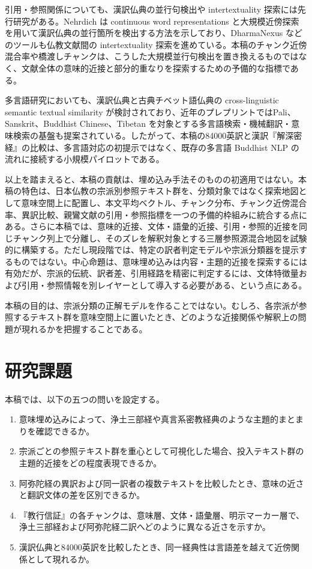 \documentclass[uplatex,dvipdfmx,11pt,a4paper]{jsarticle}
\begin{document}
引用・参照関係についても、漢訳仏典の並行句検出や intertextuality 探索には先行研究がある。Nehrdich は continuous word representations と大規模近傍探索を用いて漢訳仏典の並行箇所を検出する方法を示しており\cite{nehrdich2020}、DharmaNexus などのツールも仏教文献間の intertextuality 探索を進めている\cite{dharmanexus}。本稿のチャンク近傍混合率や橋渡しチャンクは、こうした大規模並行句検出を置き換えるものではなく、文献全体の意味的近接と部分的重なりを探索するための予備的な指標である。

多言語研究においても、漢訳仏典と古典チベット語仏典の cross-linguistic semantic textual similarity が検討されており\cite{felbur2022}、近年のプレプリントではPali、Sanskrit、Buddhist Chinese、Tibetan を対象とする多言語検索・機械翻訳・意味検索の基盤も提案されている\cite{mitra2026}。したがって、本稿の84000英訳と漢訳『解深密経』の比較は、多言語対応の初提示ではなく、既存の多言語 Buddhist NLP の流れに接続する小規模パイロットである。

以上を踏まえると、本稿の貢献は、埋め込み手法そのものの初適用ではない。本稿の特色は、日本仏教の宗派別参照テキスト群を、分類対象ではなく探索地図として意味空間上に配置し、本文平均ベクトル、チャンク分布、チャンク近傍混合率、異訳比較、親鸞文献の引用・参照指標を一つの予備的枠組みに統合する点にある。さらに本稿では、意味的近接、文体・語彙的近接、引用・参照的近接を同じチャンク列上で分離し、そのズレを解釈対象とする三層参照源混合地図を試験的に構築する。ただし現段階では、特定の訳者判定モデルや宗派分類器を提示するものではない。中心命題は、意味埋め込みは内容・主題的近接を探索するには有効だが、宗派的伝統、訳者差、引用経路を精密に判定するには、文体特徴量および引用・参照情報を別レイヤーとして導入する必要がある、という点にある。

本稿の目的は、宗派分類の正解モデルを作ることではない。むしろ、各宗派が参照するテキスト群を意味空間上に置いたとき、どのような近接関係や解釈上の問題が現れるかを把握することである。

\section{研究課題}

本稿では、以下の五つの問いを設定する。

\begin{enumerate}
  \item 意味埋め込みによって、浄土三部経や真言系密教経典のような主題的まとまりを確認できるか。
  \item 宗派ごとの参照テキスト群を重心として可視化した場合、投入テキスト群の主題的近接をどの程度表現できるか。
  \item 阿弥陀経の異訳および同一訳者の複数テキストを比較したとき、意味の近さと翻訳文体の差を区別できるか。
  \item 『教行信証』の各チャンクは、意味層、文体・語彙層、明示マーカー層で、浄土三部経および阿弥陀経二訳へどのように異なる近さを示すか。
  \item 漢訳仏典と84000英訳を比較したとき、同一経典性は言語差を越えて近傍関係として現れるか。
\end{enumerate}
\end{document}
